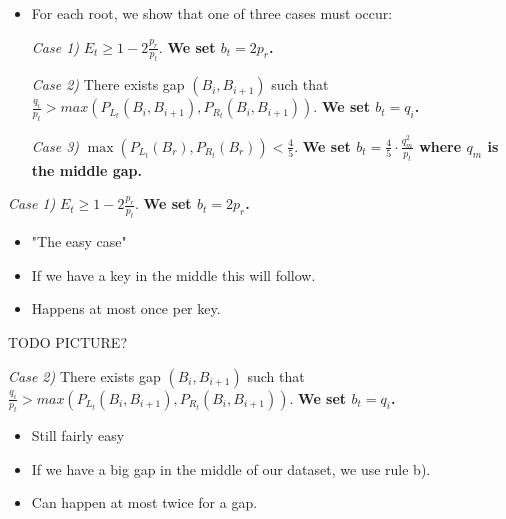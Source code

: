 \documentclass{beamer}
\theoremstyle{plain}
\begin{document}
\begin{frame}

\begin{itemize}
\item For each root, we show that one of three cases must occur:

\item[\textit{Case 1)}] $E_t \geq 1-2 \frac{p_r}{p_t}$. \textbf{We set $b_t = 2p_r$.}

\item[\textit{Case 2)}] There exists gap $(B_i, B_{i+1})$ such that $\frac{q_i}{p_t} > max(P_{L_t}(B_i, B_{i+1}), P_{R_t}(B_i, B_{i+1}))$. \textbf{We set $b_t = q_i$.}

\item[\textit{Case 3)}]  $\max(P_{L_t}(B_r), P_{R_t}(B_r)) < \frac{4}{5}$. \textbf{We set $b_t = \frac{4}{5} \cdot \frac{q_m^2}{p_t}$ where $q_m$ is the middle gap.}

\end{itemize}


\end{frame}

\begin{frame}

\textit{Case 1)} $E_t \geq 1-2 \frac{p_r}{p_t}$. \textbf{We set $b_t = 2p_r$.}


\begin{itemize}
\item "The easy case"
\item If we have a key in the middle this will follow.
\item Happens at most once per key.
\end{itemize}
TODO PICTURE?
\end{frame}
\begin{frame}
\textit{Case 2)} There exists gap $(B_i, B_{i+1})$ such that $\frac{q_i}{p_t} > max(P_{L_t}(B_i, B_{i+1}), P_{R_t}(B_i, B_{i+1}))$. \textbf{We set $b_t = q_i$.}
\begin{itemize}
\item Still fairly easy
\item If we have a big gap in the middle of our dataset, we use rule b).
\item Can happen at most twice for a gap.
\end{itemize}
\end{frame}
\end{document}
